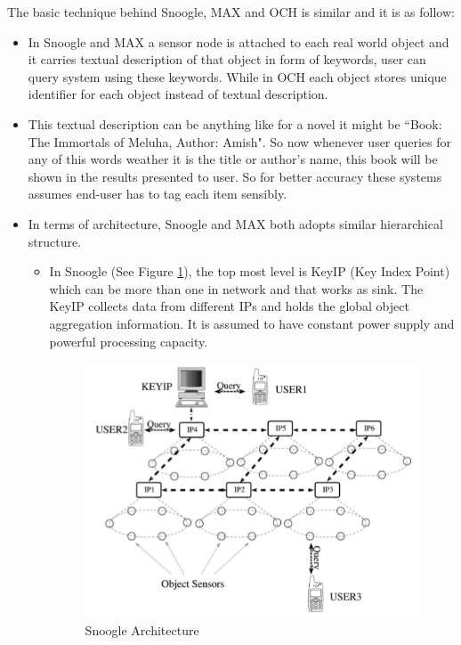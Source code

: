 \documentclass [a4paper,12pt]{book}
\begin{document}
The basic technique behind Snoogle\cite{11}\cite{12}, MAX\cite{13} and OCH\cite{14} is similar and it is as follow:
\begin{itemize}

\item In Snoogle and MAX a sensor node is attached to each real world object and it carries textual description of that object in form of keywords, user can query system using these keywords. While in OCH each object stores unique identifier for each object instead of textual description.

\item This textual description can be anything like for a novel it might be ``Book: The Immortals of Meluha, Author: Amish". So now whenever user queries for any of this words weather it is the title or author's name, this book will be shown in the results presented to user. So for better accuracy these systems assumes end-user has to tag each item sensibly.

\item In terms of architecture, Snoogle and MAX both adopts similar hierarchical structure.
\begin{itemize}
\item In Snoogle (See Figure \ref{snoogle}), the top most level is KeyIP (Key Index Point) which can be more than one in network and that works as sink. The KeyIP collects data from different IPs and holds the global object aggregation information. It is assumed to have constant power supply and powerful processing capacity.

\vspace{0.5cm}
\begin{figure}[!h]
\begin{center}
\includegraphics[scale=.6]{images/3.png}
\caption{Snoogle Architecture \cite{11}}
\label{snoogle}
\end{center}
\end{figure}



\end{itemize}
\end{itemize}
\end{document}
